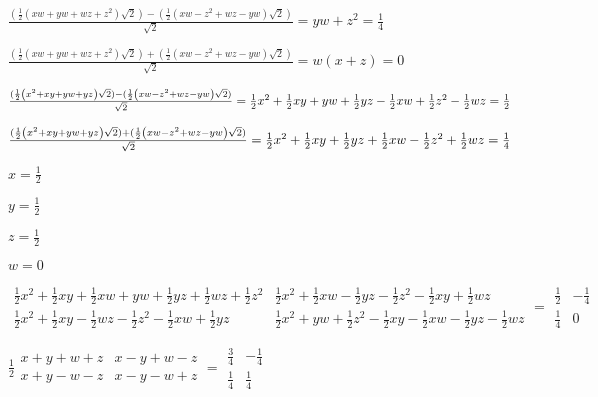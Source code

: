 \documentclass{article}
\begin{document}
$\frac{(\frac{1}{2}\left( xw+yw+wz+z^{2}\right) \sqrt{2})-(\frac{1}{2}\left(
xw-z^{2}+wz-yw\right) \sqrt{2})}{\sqrt{2}}=\allowbreak yw+z^{2}=\allowbreak 
\frac{1}{4}$

$\frac{(\frac{1}{2}\left( xw+yw+wz+z^{2}\right) \sqrt{2})+(\frac{1}{2}\left(
xw-z^{2}+wz-yw\right) \sqrt{2})}{\sqrt{2}}=\allowbreak w\left( x+z\right)
=\allowbreak 0$

$\frac{(\allowbreak \frac{1}{2}\left( x^{2}+xy+yw+yz\right) \sqrt{2})-(\frac{%
1}{2}\left( xw-z^{2}+wz-yw\right) \sqrt{2})}{\sqrt{2}}=\allowbreak \frac{1}{2%
}x^{2}+\frac{1}{2}xy+yw+\frac{1}{2}yz-\frac{1}{2}xw+\frac{1}{2}z^{2}-\frac{1%
}{2}wz=\allowbreak \frac{1}{2}$

$\frac{(\allowbreak \frac{1}{2}\left( x^{2}+xy+yw+yz\right) \sqrt{2})+(\frac{%
1}{2}\left( xw-z^{2}+wz-yw\right) \sqrt{2})}{\sqrt{2}}=\allowbreak \frac{1}{2%
}x^{2}+\frac{1}{2}xy+\frac{1}{2}yz+\frac{1}{2}xw-\frac{1}{2}z^{2}+\frac{1}{2}%
wz=\allowbreak \frac{1}{4}$

$x=\frac{1}{2}$

$y=\frac{1}{2}$

$z=\frac{1}{2}$

$w=0$

$
\begin{array}{cc}
\frac{1}{2}x^{2}+\frac{1}{2}xy+\frac{1}{2}xw+yw+\frac{1}{2}yz+\frac{1}{2}wz+%
\frac{1}{2}z^{2} & \frac{1}{2}x^{2}+\frac{1}{2}xw-\frac{1}{2}yz-\frac{1}{2}%
z^{2}-\frac{1}{2}xy+\frac{1}{2}wz \\ 
\frac{1}{2}x^{2}+\frac{1}{2}xy-\frac{1}{2}wz-\frac{1}{2}z^{2}-\frac{1}{2}xw+%
\frac{1}{2}yz & \frac{1}{2}x^{2}+yw+\frac{1}{2}z^{2}-\frac{1}{2}xy-\frac{1}{2%
}xw-\frac{1}{2}yz-\frac{1}{2}wz
\end{array}
\allowbreak =\allowbreak 
\begin{array}{cc}
\frac{1}{2} & -\frac{1}{4} \\ 
\frac{1}{4} & 0
\end{array}
$

$\frac{1}{2}
\begin{array}{cc}
x+y+w+z & x-y+w-z \\ 
x+y-w-z & x-y-w+z
\end{array}
=\allowbreak 
\begin{array}{cc}
\frac{3}{4} & -\frac{1}{4} \\ 
\frac{1}{4} & \frac{1}{4}
\end{array}
$

\bigskip 
\end{document}
